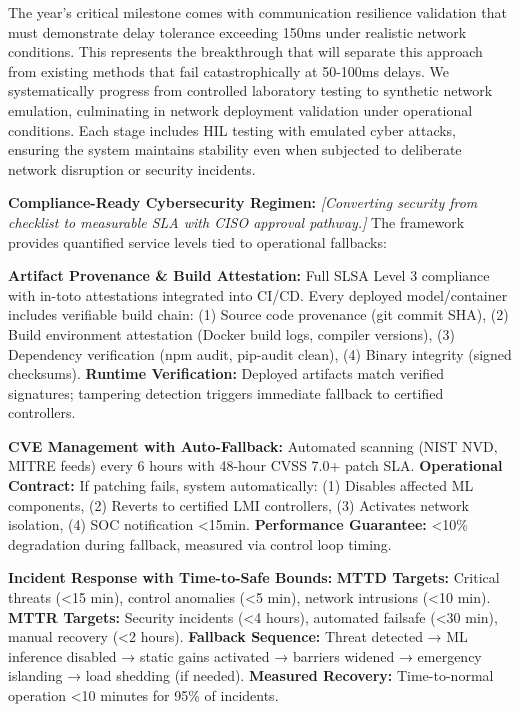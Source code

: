 \documentclass[12pt]{article}
\begin{document}
The year's critical milestone comes with communication resilience validation that must demonstrate delay tolerance exceeding 150ms under realistic network conditions. This represents the breakthrough that will separate this approach from existing methods that fail catastrophically at 50-100ms delays. We systematically progress from controlled laboratory testing to synthetic network emulation, culminating in network deployment validation under operational conditions. Each stage includes HIL testing with emulated cyber attacks, ensuring the system maintains stability even when subjected to deliberate network disruption or security incidents.

\textbf{Compliance-Ready Cybersecurity Regimen:} \textit{[Converting security from checklist to measurable SLA with CISO approval pathway.]} The framework provides quantified service levels tied to operational fallbacks:

\textbf{Artifact Provenance \& Build Attestation:} Full SLSA Level 3 compliance with in-toto attestations integrated into CI/CD. Every deployed model/container includes verifiable build chain: (1) Source code provenance (git commit SHA), (2) Build environment attestation (Docker build logs, compiler versions), (3) Dependency verification (npm audit, pip-audit clean), (4) Binary integrity (signed checksums). \textbf{Runtime Verification:} Deployed artifacts match verified signatures; tampering detection triggers immediate fallback to certified controllers.

\textbf{CVE Management with Auto-Fallback:} Automated scanning (NIST NVD, MITRE feeds) every 6 hours with 48-hour CVSS 7.0+ patch SLA. \textbf{Operational Contract:} If patching fails, system automatically: (1) Disables affected ML components, (2) Reverts to certified LMI controllers, (3) Activates network isolation, (4) SOC notification <15min. \textbf{Performance Guarantee:} <10\% degradation during fallback, measured via control loop timing.

\textbf{Incident Response with Time-to-Safe Bounds:} \textbf{MTTD Targets:} Critical threats (<15 min), control anomalies (<5 min), network intrusions (<10 min). \textbf{MTTR Targets:} Security incidents (<4 hours), automated failsafe (<30 min), manual recovery (<2 hours). \textbf{Fallback Sequence:} Threat detected → ML inference disabled → static gains activated → barriers widened → emergency islanding → load shedding (if needed). \textbf{Measured Recovery:} Time-to-normal operation <10 minutes for 95\% of incidents.
\end{document}
